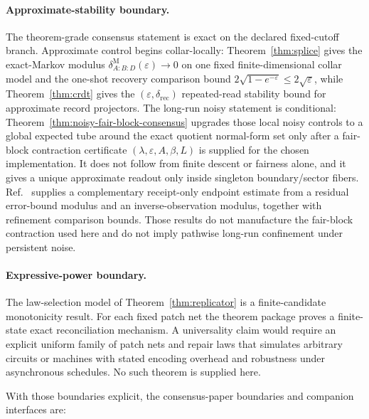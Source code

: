 \documentclass[11pt]{article}
\theoremstyle{remark}
\theoremstyle{plain}
\begin{document}
\paragraph{Approximate-stability boundary.}
The theorem-grade consensus statement is exact on the declared fixed-cutoff branch. Approximate
control begins collar-locally: Theorem~\ref{thm:splice} gives the exact-Markov modulus
\(\delta^{\mathrm M}_{A:B:D}(\varepsilon)\to0\) on one fixed finite-dimensional collar model and
the one-shot recovery comparison bound \(2\sqrt{1-e^{-\varepsilon}}\le 2\sqrt{\varepsilon}\),
while Theorem~\ref{thm:crdt} gives the \((\varepsilon,\delta_{\mathrm{rec}})\) repeated-read
stability bound for approximate record projectors. The long-run noisy statement is conditional:
Theorem~\ref{thm:noisy-fair-block-consensus} upgrades those local noisy controls to a global
expected tube around the exact quotient normal-form set only after a fair-block contraction
certificate \((\lambda,\varepsilon,A,\beta,L)\) is supplied for the chosen implementation. It does
not follow from finite descent or fairness alone, and it gives a unique approximate readout only
inside singleton boundary/sector fibers.
Ref.~\cite{observableNormalForms} supplies a complementary receipt-only endpoint estimate from a
residual error-bound modulus and an inverse-observation modulus, together with refinement
comparison bounds. Those results do not manufacture the fair-block contraction used here and do
not imply pathwise long-run confinement under persistent noise.

\paragraph{Expressive-power boundary.}
The law-selection model of Theorem~\ref{thm:replicator} is a finite-candidate monotonicity result.
For each fixed patch net the theorem package proves a finite-state exact reconciliation
mechanism. A universality claim would require an explicit uniform family of patch nets and repair laws that
simulates arbitrary circuits or machines with stated encoding overhead and robustness under
asynchronous schedules. No such theorem is supplied here.

With those boundaries explicit, the consensus-paper boundaries and companion interfaces are:
\end{document}
